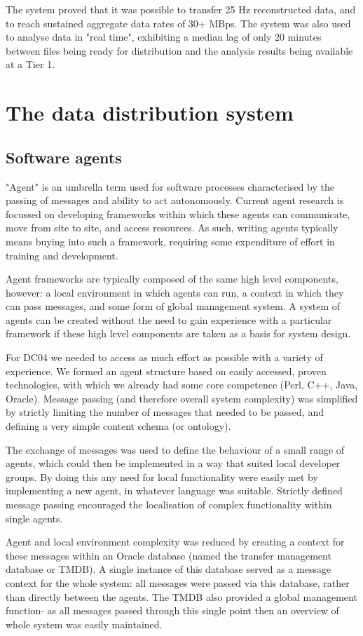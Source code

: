 \documentclass{cmspaper}
\begin{document}
The system proved that it was possible to transfer 25 Hz reconstructed data,
and to reach sustained aggregate data rates of 30+ MBps. The system was also
used to analyse data in "real time", exhibiting a median lag of only 20
minutes between files being ready for distribution and the analysis results
being available at a Tier 1.

\section{The data distribution system}
\subsection{Software agents}
"Agent" is an umbrella term used for software processes characterised by the passing of messages and ability to act autonomously. Current agent research is focussed on developing frameworks within which these agents can communicate, move from site to site, and access resources. As such, writing agents typically means buying into such a framework, requiring some expenditure of effort in training and development.

Agent frameworks are typically composed of the same high level components, however: a local environment in which agents can run, a context in which they can pass messages, and some form of global management system. A system of agents can be created without the need to gain experience with a particular framework if these high level components are taken as a basis for system design.

For DC04 we needed to access as much effort as possible with a variety of experience. We formed an agent structure based on easily accessed, proven technologies, with which we already had some core competence (Perl, C++, Java, Oracle). Message passing (and therefore overall system complexity) was simplified by strictly limiting the number of messages that needed to be passed, and defining a very simple content schema (or ontology). 

The exchange of messages was used to define the behaviour of a small range of agents, which could then be implemented in a way that suited local developer groups. By doing this any need for local functionality were easily met by
implementing a new agent, in whatever language was suitable. Strictly defined
message passing encouraged the localisation of complex functionality within
single agents.

Agent and local environment complexity was reduced by creating a context for these messages within an Oracle database (named the transfer management database or TMDB). A single instance of this database served as a message context for the whole system: all messages were passed via this database, rather than directly between the agents. The TMDB also provided a global management function- as all messages passed through this single point then an overview of whole system was easily maintained.
\end{document}
